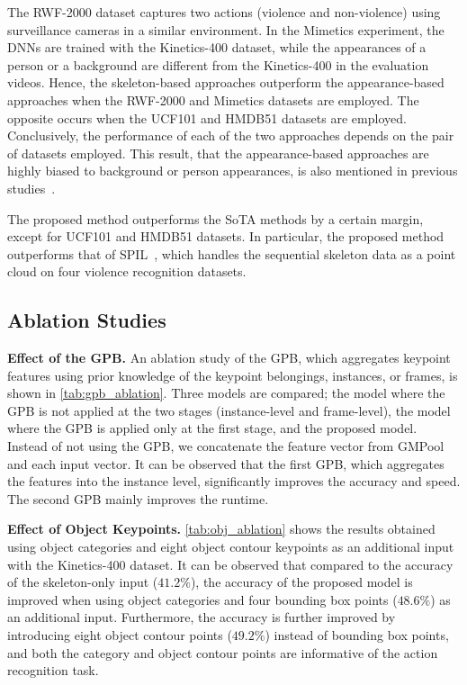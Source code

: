 \documentclass[10pt,twocolumn,letterpaper]{article}
\begin{document}
The RWF-2000 dataset captures two actions (violence and non-violence) using surveillance cameras in a similar environment.
In the Mimetics experiment, the DNNs are trained with the Kinetics-400 dataset, while the appearances of a person or a background are different from the Kinetics-400 in the evaluation videos.
Hence, the skeleton-based approaches outperform the appearance-based approaches when the RWF-2000 and Mimetics datasets are employed. The opposite occurs when the UCF101 and HMDB51 datasets are employed.
Conclusively, the performance of each of the two approaches depends on the pair of datasets employed.
This result, that the appearance-based approaches are highly biased to background or person appearances, is also mentioned in previous studies~\cite{Choi2019Neurips,Weinzaepfel2021IJCV,Moon2021CVPR}.

The proposed method outperforms the SoTA methods by a certain margin, except for UCF101 and HMDB51 datasets.
In particular, the proposed method outperforms that of SPIL~\cite{Su2020ECCV}, which handles the sequential skeleton data as a point cloud on four violence recognition datasets.

\subsection{Ablation Studies}
\label{sec:ablation}

\noindent \textbf{Effect of the GPB.}
An ablation study of the GPB, which aggregates keypoint features using prior knowledge of the keypoint belongings, instances, or frames, is shown in \cref{tab:gpb_ablation}.
Three models are compared; the model where the GPB is not applied at the two stages (instance-level and frame-level), the model where the GPB is applied only at the first stage, and the proposed model.
Instead of not using the GPB, we concatenate the feature vector from GMPool and each input vector.
It can be observed that the first GPB, which aggregates the features into the instance level, significantly improves the accuracy and speed.
The second GPB mainly improves the runtime.

\noindent \textbf{Effect of Object Keypoints.}
\cref{tab:obj_ablation} shows the results obtained using object categories and eight object contour keypoints as an additional input with the Kinetics-400 dataset.
It can be observed that compared to the accuracy of the skeleton-only input ($41.2\%$), the accuracy of the proposed model is improved when using object categories and four bounding box points ($48.6\%$) as an additional input.
Furthermore, the accuracy is further improved by introducing eight object contour points ($49.2\%$) instead of bounding box points, and both the category and object contour points are informative of the action recognition task.
\end{document}
